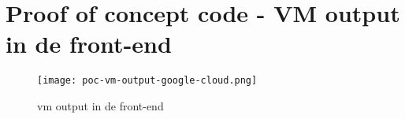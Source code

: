 \section{Proof of concept code - VM output in de front-end}\label{appendix:poc-vm-output-google-cloud}
\begin{figure}[hbt!]
  \centering
  \texttt{[image: poc-vm-output-google-cloud.png]}
  \caption{\acrfull{vm} output in de front-end}
  \label{fig:poc-vm-output-google-cloud}
\end{figure}

\newpage